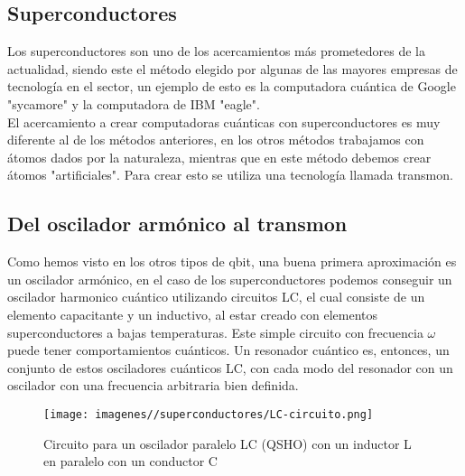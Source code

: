 \subsection{Superconductores}
Los superconductores son uno de los acercamientos más prometedores de la actualidad, siendo este el método elegido por algunas de las mayores empresas de tecnología en el sector, un ejemplo de esto es la computadora cuántica de Google "sycamore" y la computadora de IBM "eagle".\\
El acercamiento a crear computadoras cuánticas con superconductores es muy diferente al de los métodos anteriores, en los otros métodos trabajamos con átomos dados por la naturaleza, mientras que en este método debemos crear átomos "artificiales". Para crear esto se utiliza una tecnología llamada transmon.
\subsection{Del oscilador armónico al transmon}

Como hemos visto en los otros tipos de qbit, una buena primera aproximación es un oscilador armónico, en el caso de los superconductores podemos conseguir un oscilador harmonico cuántico utilizando circuitos LC, el cual consiste de un elemento capacitante y un inductivo, al estar creado con elementos superconductores a bajas temperaturas. Este simple circuito con frecuencia $\omega$ puede tener comportamientos cuánticos. Un resonador cuántico es, entonces, un conjunto de estos osciladores cuánticos LC, con cada modo del resonador con un oscilador con una frecuencia arbitraria bien definida.\\

\begin{figure}
    \centering
    \texttt{[image: imagenes//superconductores/LC-circuito.png]}
    \caption{Circuito para un oscilador paralelo LC (QSHO) con un inductor L en paralelo con un conductor C}
    \label{fig:enter-label}
\end{figure}

